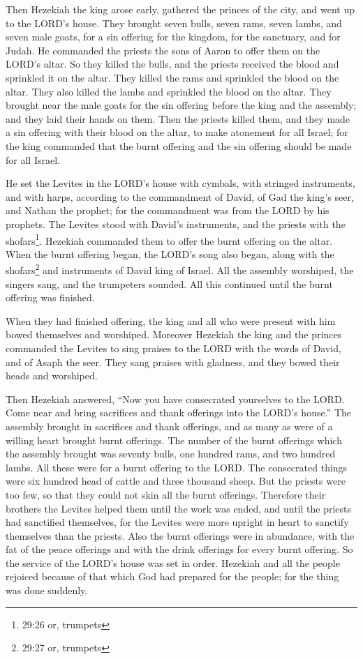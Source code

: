 \myverse{}Then Hezekiah the king arose early, gathered the princes of
the city, and went up to the LORD’s house.
\myverse{}They brought seven bulls, seven rams, seven lambs, and seven male goats,
for a sin offering for the kingdom, for the sanctuary, and for Judah. He commanded the priests the sons
of Aaron to offer them on the LORD’s altar.
\myverse{}So they killed the bulls, and the priests received the blood and sprinkled
it on the altar. They killed the rams and sprinkled the blood on the altar. They also killed the lambs
and sprinkled the blood on the altar.
\myverse{}They brought near the male goats for the sin offering before the king and
the assembly; and they laid their hands on them.
\myverse{}Then the priests killed them, and they made a sin offering with their blood
on the altar, to make atonement for all Israel; for the king commanded that the burnt offering and the
sin offering should be made for all Israel.

\myverse{}He set the Levites in the LORD’s house with cymbals, with stringed
instruments, and with harps, according to the commandment of David, of Gad the king’s seer, and Nathan
the prophet; for the commandment was from the LORD by his prophets.
\myverse{}The Levites stood with David’s instruments, and the priests with the shofars\footnote{29:26 or, trumpets}.
\myverse{}Hezekiah commanded them to offer the burnt offering on the altar. When the
burnt offering began, the LORD’s song also began, along with the shofars\footnote{29:27 or, trumpets}
and instruments of David king of Israel.
\myverse{}All the assembly worshiped, the singers sang, and the trumpeters sounded.
All this continued until the burnt offering was finished.

\myverse{}When they had finished offering, the king and all who were present
with him bowed themselves and worshiped.
\myverse{}Moreover Hezekiah the king and the princes commanded the Levites to sing
praises to the LORD with the words of David, and of Asaph the seer. They sang praises with gladness, and
they bowed their heads and worshiped.

\myverse{}Then Hezekiah answered, “Now you have consecrated yourselves
to the LORD. Come near and bring sacrifices and thank offerings into the LORD’s house.” The assembly brought
in sacrifices and thank offerings, and as many as were of a willing heart brought burnt offerings.
\myverse{}The number of the burnt offerings which the assembly brought was seventy
bulls, one hundred rams, and two hundred lambs. All these were for a burnt offering to the LORD.
\myverse{}The consecrated things were six hundred head of cattle and three thousand
sheep.
\myverse{}But the priests were too few, so that they could not skin all the burnt offerings.
Therefore their brothers the Levites helped them until the work was ended, and until the priests had sanctified
themselves, for the Levites were more upright in heart to sanctify themselves than the priests.
\myverse{}Also the burnt offerings were in abundance, with the fat of the peace offerings
and with the drink offerings for every burnt offering. So the service of the LORD’s house was set in order.
\myverse{}Hezekiah and all the people rejoiced because of that which God had prepared
for the people; for the thing was done suddenly.


